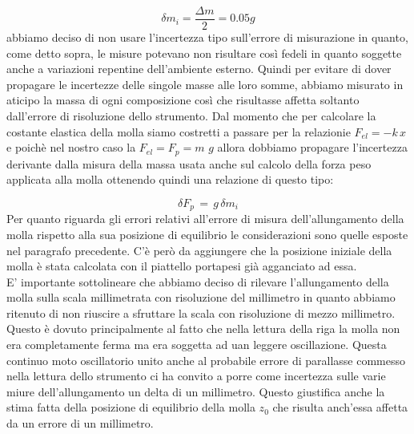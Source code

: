 \begin{equation*}
	\delta m_i = \frac{\Delta m}{2} = 0.05 g 
\end{equation*}
abbiamo deciso di non usare l'incertezza tipo sull'errore di misurazione in quanto, come detto sopra, le misure potevano non risultare così fedeli in quanto soggette anche a variazioni repentine dell'ambiente esterno.
Quindi per evitare di dover propagare le incertezze delle singole masse alle loro somme, abbiamo misurato in aticipo la massa di ogni composizione così che risultasse affetta soltanto dall'errore di risoluzione dello strumento.
Dal momento che per calcolare la costante elastica della molla siamo costretti a passare per la relazionie $F_{el} = -k\,x$ e poichè nel nostro caso la $F_{el} = F_{p} = m\,\,g$ allora dobbiamo propagare l'incertezza derivante dalla misura della massa usata anche sul calcolo della forza peso applicata alla molla ottenendo quindi una relazione di questo tipo:

\begin{equation*}
	\delta F_{p}\, =\, g\,\delta m_i
\end{equation*}
Per quanto riguarda gli errori relativi all'errore di misura dell'allungamento della molla rispetto alla sua posizione di equilibrio le considerazioni sono quelle esposte nel paragrafo precedente. C'è però da aggiungere che la posizione iniziale della molla è stata calcolata con il piattello portapesi già agganciato ad essa.\\
E' importante sottolineare che abbiamo deciso di rilevare l'allungamento della molla sulla scala millimetrata con risoluzione del millimetro in quanto abbiamo ritenuto di non riuscire a sfruttare la scala con risoluzione di mezzo millimetro. Questo è dovuto principalmente al fatto che nella lettura della riga la molla non era completamente ferma ma era soggetta ad uan leggere oscillazione. Questa continuo moto oscillatorio unito anche al probabile errore di parallasse commesso nella lettura dello strumento ci ha convito a porre come incertezza sulle varie miure dell'allungamento un delta di un millimetro. Questo giustifica anche la stima fatta della posizione di equilibrio della molla $z_0$ che risulta anch'essa affetta da un errore di un millimetro.

